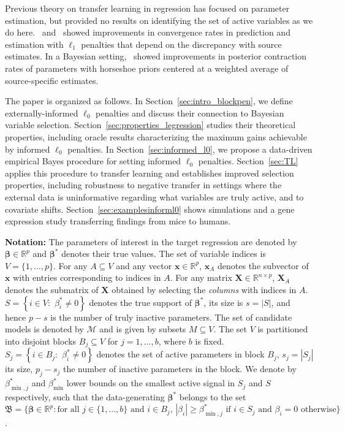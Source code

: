 \documentclass[
  12pt]{article}
\newcommand{\R}{\mathbb{R}}
\newcommand{\M}{\mathcal{M}}
\newcommand{\bx}{\mathbf{x}}
\newcommand{\bbeta}{\boldsymbol{\beta}}
\newcommand{\bX}{\mathbf{X}}
\begin{document}
Previous theory on transfer learning in  regression has focused on parameter estimation, but provided no results on identifying the set of active variables as we do here.~\cite{Jiang2016} and~\cite{Li2021} showed improvements in convergence rates in prediction and estimation with $\ell_1$ penalties that depend on the discrepancy with source estimates. In a Bayesian setting,~\cite{lai2024} showed improvements in posterior contraction rates of parameters with horseshoe priors centered at a weighted average of source-specific estimates.

The paper is organized as follows.
In Section~\ref{sec:intro_blockpen}, we define externally-informed $\ell_0$ penalties and discuss their connection to Bayesian variable selection.
Section~\ref{sec:properties_legression} studies their theoretical properties, including oracle results characterizing the maximum gains achievable by informed $\ell_0$ penalties. In Section~\ref{sec:informed_l0}, we propose a data-driven empirical Bayes procedure for setting informed $\ell_0$ penalties.
Section~\ref{sec:TL} applies this procedure to transfer learning and establishes improved selection properties, including robustness to negative transfer in settings where the external data is uninformative regarding what variables are truly active, and to covariate shifts.
Section~\ref{sec:examplesinforml0} shows simulations and a gene expression study transferring findings from mice to humans.

\textbf{Notation:}
The parameters of interest in the target regression are denoted by $\bbeta\in \R^p$  
and $\bbeta^*$ denotes their true values. The set of variable indices is $V=\{1,\ldots,p\}$. For any $A\subseteq V$ and any vector $\bx\in \R^p$, $\bx_A$ denotes the subvector of $\bx$ with entries corresponding to indices in $A$. For any matrix $\bX \in \R^{n\times p}$, $\bX_A$ denotes the submatrix of $\bX$ obtained by selecting the \emph{columns} with indices in $A$. $S=\left\{i\in V:\,\,  \beta^*_i \neq 0 \right\}$ denotes the true support of $\bbeta^*$, its size is $s=|S|$, and hence $p-s$ is the number of truly inactive parameters. The set of candidate models is denoted by $\M$ and is given by subsets $M\subseteq V$. The set $V$ is partitioned into disjoint blocks $B_j \subseteq V$ for $j=1,\ldots,b$, where $b$ is fixed. $S_j=\left\{i\in B_j:\,\,  \beta^*_i \neq 0\right\}$ denotes the set of active parameters in block $B_j$, $s_j=|S_j|$ its size, $p_j-s_j$ the number of inactive parameters in the block. We denote by $\beta_{\min,j}^*$ and $\beta_{\min}^*$ lower bounds on the smallest active signal in $S_j$ and $S$ respectively, such that
the data-generating $\bbeta^*$ belongs to the set $\mathfrak{B}=\{\bbeta \in \R^p: \text{for all }j \in \{1,\ldots,b\} \text{ and }i \in B_j,\, |\beta_i|\geq  \beta^*_{\min,j} \text{ if } i\in S_j \text{ and }  \beta_i= 0 \text{ otherwise}\}$.
\end{document}

